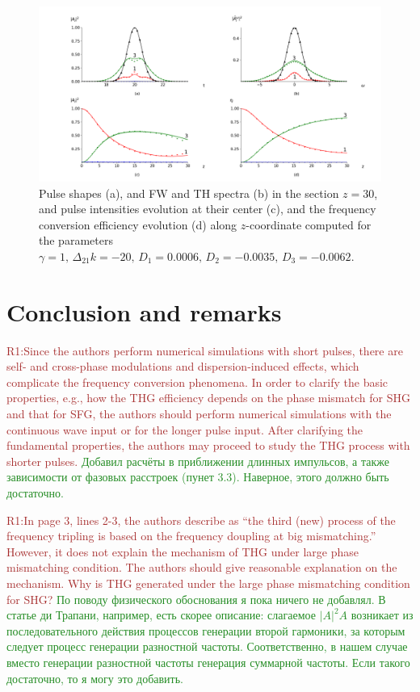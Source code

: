 \documentclass[a4paper, 12pt, onecolumn]{extarticle}
\begin{document}
\begin{figure}[h!] 
\centering 
\includegraphics[width=0.9\linewidth]{Cascade1_12}  
\caption{Pulse shapes (a), and FW and TH spectra (b) in the section \(z=30\), and pulse intensities evolution at their center (c), and the frequency conversion efficiency evolution (d) along \(z\)-coordinate computed for the parameters  $\gamma=1,\, \Delta_{21} k=-20,\, D_1=0.0006,\, D_2=-0.0035,\, D_3=-0.0062.$} 
\label{fr:c1_12}
\end{figure}

\section{Conclusion and remarks}


\textcolor{brown}{R1:Since the authors perform numerical simulations with short pulses, there are self- and cross-phase modulations and dispersion-induced effects, which complicate the frequency conversion phenomena. In order to clarify the basic properties, e.g., how the THG efficiency depends on the phase mismatch for SHG and that for SFG, the authors should perform numerical simulations with the continuous wave input or for the longer pulse input. After clarifying the fundamental properties, the authors may proceed to study the THG process with shorter pulses.}
\textcolor{ForestGreen}{Добавил расчёты в приближении длинных импульсов, а также зависимости от фазовых расстроек (пунет 3.3). Наверное, этого должно быть достаточно.}

\textcolor{brown}{R1:In page 3, lines 2-3, the authors describe as “the third (new) process of the frequency tripling is based on the frequency doupling at big mismatching.” However, it does not explain the mechanism of THG under large phase mismatching condition. The authors should give reasonable explanation on the mechanism. Why is THG generated under the large phase mismatching condition for SHG?} \textcolor{ForestGreen}{По поводу физического обоснования я пока ничего не добавлял. В статье ди Трапани, например, есть скорее описание: слагаемое $|A|^2A$ возникает из последовательного действия процессов генерации второй гармоники, за которым следует процесс генерации разностной частоты. Соответственно, в нашем случае вместо генерации разностной частоты генерация суммарной частоты. Если такого достаточно, то я могу это добавить.}
\end{document}
